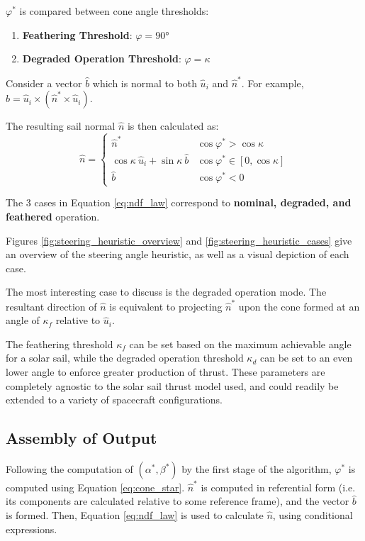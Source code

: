 $\varphi^*$ is compared between cone angle thresholds:
\begin{enumerate}
  \item \textbf{Feathering Threshold}: $\varphi = \ang{90}$
  \item \textbf{Degraded Operation Threshold}: $\varphi = \kappa$
\end{enumerate}

Consider a vector $\hat{b}$ which is normal to both $\hat{u}_i$ and $\hat{n}^*$. For example, $\hat{b} = \hat{u}_i \times (\hat{n}^* \times \hat{u}_i)$.

The resulting sail normal $\hat{n}$ is then calculated as:
\begin{equation}
  \hat{n} = \begin{cases}
    \hat{n}^*                                       & \cos \varphi^* > \cos \kappa          \\
    \cos \kappa \ \hat{u}_i + \sin \kappa \ \hat{b} & \cos \varphi^* \in  [ 0, \cos \kappa] \\
    \hat{b}                                         & \cos \varphi^* < 0
  \end{cases}
  \label{eq:ndf_law}
\end{equation}

The 3 cases in Equation \ref{eq:ndf_law} correspond to \textbf{nominal, degraded, and feathered} operation.




Figures \ref{fig:steering_heuristic_overview} and \ref{fig:steering_heuristic_cases} give an overview of the steering angle heuristic, as well as a visual depiction of each case.

The most interesting case to discuss is the degraded operation mode. The resultant direction of $\hat{n}$ is equivalent to projecting $\hat{n}^*$ upon the cone formed at an angle of $\kappa_f$ relative to $\hat{u}_i$.

The feathering threshold $\kappa_f$ can be set based on the maximum achievable angle for a solar sail, while the degraded operation threshold $\kappa_d$ can be set to an even lower angle to enforce greater production of thrust. These parameters are completely agnostic to the solar sail thrust model used, and could readily be extended to a variety of spacecraft configurations.

\subsection{Assembly of Output}
Following the computation of $(\alpha^*, \beta^*)$ by the first stage of the algorithm, $\varphi^*$ is computed using Equation \ref{eq:cone_star}. $\hat{n}^*$ is computed in referential form (i.e. its components are calculated relative to some reference frame), and the vector $\hat{b}$ is formed. Then, Equation \ref{eq:ndf_law} is used to calculate $\hat{n}$, using conditional expressions.

